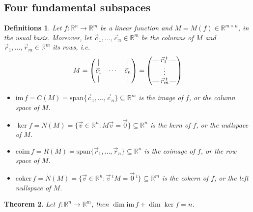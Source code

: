 \documentclass{article}
\newtheorem{theorem}{Theorem}
\newtheorem{definitions}[theorem]{Definitions}
\theoremstyle{remark}
\newcommand\spans{\mathrm{span}}
\newcommand\im{\mathrm{im\,}}
\newcommand\coim{\mathrm{coim\,}}
\newcommand\coker{\mathrm{coker\,}}
\begin{document}
    \subsection{Four fundamental subspaces}
    \begin{definitions} Let $f:\mathbb{R}^n\to\mathbb{R}^m$ be a linear function and $M=M(f)\in\mathbb{R}^{m\times n}$, in the usual basis. Moreover, let $\vec{c}_1,\ldots,\vec{c}_n\in\mathbb{R}^m$ be the columns of $M$ and $\vec{r}_1,\ldots,\vec{r}_m\in\mathbb{R}^m$ its rows, i.e.
        \[M=\begin{pmatrix}|&&|\\\vec{c}_1&\cdots&\vec{c}_n\\|&&|\\\end{pmatrix}
            =\setlength{\arraycolsep}{1pt}
            \begin{pmatrix}
            \textrm{---}&\vec{r}_1\!^t&\textrm{---}\\&\vdots&\\\textrm{---}&\vec{r}_m\!\!\!^t&\textrm{---}\\
            \end{pmatrix}
            \setlength{\arraycolsep}{5pt}\]
        \begin{itemize}
            \item $\im f=C(M)=\spans\{\vec{c}_1,\ldots,\vec{c}_n\}\subseteq\mathbb{R}^m$ is the \emph{image} of $f$, or the \emph{column space} of $M$.
            \item $\ker f=N(M)=\big\{\vec{v}\in\mathbb{R}^n:M\vec{v}=\vec{0}\big\}\subseteq\mathbb{R}^n$ is the \emph{kern} of $f$, or the \emph{nullspace} of $M$.
            \item $\coim f=R(M)=\spans\{\vec{r}_1,\ldots,\vec{r}_n\}\subseteq\mathbb{R}^n$ is the \emph{coimage} of $f$, or the \emph{row space} of $M$.
            \item $\coker f=\tilde{N}(M)=\big\{\vec{v}\in\mathbb{R}^n:\vec{v}\,^tM=\vec{0}\,^t\big\}\subseteq\mathbb{R}^m$ is the \emph{cokern} of $f$, or the \emph{left nullspace} of $M$.
        \end{itemize}
    \end{definitions}
    \begin{theorem} Let $f:\mathbb{R}^n\to\mathbb{R}^m$, then $\dim\im f+\dim\ker f=n$.
    \end{theorem}
\end{document}
